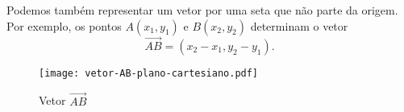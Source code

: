 Podemos tamb\'em representar um vetor por uma seta que n\~ao parte da origem. Por exemplo, os pontos $A(x_1,y_1)$ e $B(x_2,y_2)$ determinam o vetor
\[
	\vec{AB} = (x_2 - x_1, y_2 - y_1).
\]
\begin{figure}[!h]
	\centering
	\caption{Vetor $\vec{AB}$}
	\texttt{[image: vetor-AB-plano-cartesiano.pdf]}
\end{figure}

